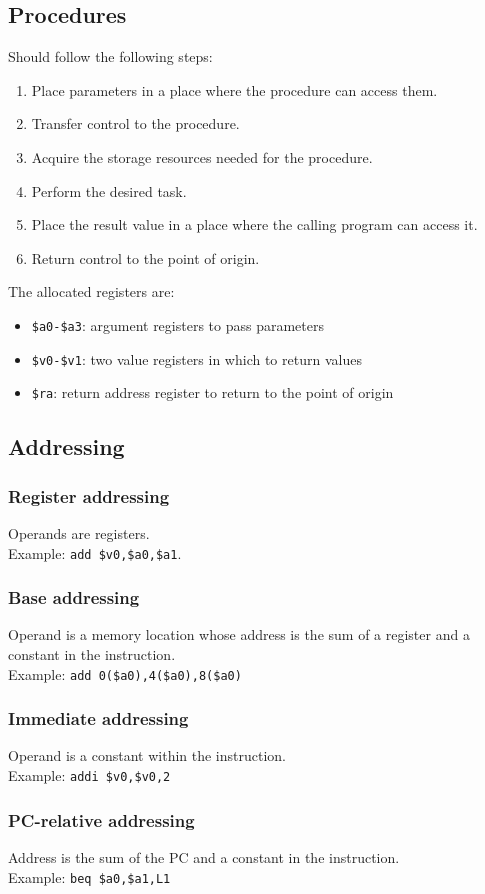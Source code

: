 \documentclass{article}
\newcommand{\T}[1]{\texttt{#1}}
\begin{document}
\subsection{Procedures}
Should follow the following steps:
\begin{enumerate}
	\item Place parameters in a place where the procedure can access them.
	\item Transfer control to the procedure.
	\item Acquire the storage resources needed for the procedure.
	\item Perform the desired task.
	\item Place the result value in a place where the calling program can access it.
	\item Return control to the point of origin.
\end{enumerate}
The allocated registers are:
\begin{itemize}
	\item \T{\$a0-\$a3}: argument registers to pass parameters
	\item \T{\$v0-\$v1}: two value registers in which to return values
	\item \T{\$ra}: return address register to return to the point of origin
\end{itemize}
\subsection{Addressing}
\subsubsection{Register addressing}
Operands are registers.\\ Example: \T{add \$v0,\$a0,\$a1}.
\subsubsection{Base addressing}
Operand is a memory location whose address is the sum of a register and a constant in the instruction.\\
Example: \T{add 0(\$a0),4(\$a0),8(\$a0)}
\subsubsection{Immediate addressing}
Operand is a constant within the instruction.\\
Example: \T{addi \$v0,\$v0,2}
\subsubsection{PC-relative addressing}
Address is the sum of the PC and a constant in the instruction.\\
Example: \T{beq \$a0,\$a1,L1}
\end{document}

